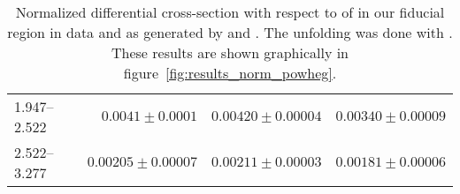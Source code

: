 \begin{table}
\begin{center}
\begin{tabular}{@{}l r r r@{}}
            1.947--2.522  &  $0.0041   \pm  0.0001$   &  $0.00420  \pm  0.00004$  &  $0.00340  \pm  0.00009$  \\
            2.522--3.277  &  $0.00205  \pm  0.00007$  &  $0.00211  \pm  0.00003$  &  $0.00181  \pm  0.00006$  \\
            \bottomrule
        \end{tabular}
    \end{center}
    \caption[
        Normalized differential cross-section with respect to \phistar of
        \Ztoee with \POWHEG unfolding.
    ]{
        Normalized differential cross-section with respect to \phistar of
        \Ztoee in our fiducial region in data and as generated by \MADGRAPH and
        \POWHEG. The unfolding was done with \POWHEG. These results are shown
        graphically in figure~\ref{fig:results_norm_powheg}.
    }
    \label{tab:results_norm}
\end{table}
